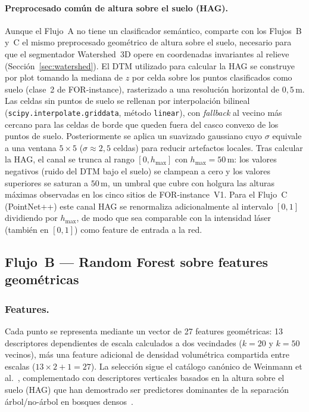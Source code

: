 \documentclass[runningheads]{llncs}
\begin{document}
\paragraph{Preprocesado com\'un de altura sobre el suelo (HAG).}
Aunque el Flujo~A no tiene un clasificador sem\'antico, comparte con los Flujos~B y~C el mismo preprocesado geom\'etrico de altura sobre el suelo, necesario para que el segmentador Watershed~3D opere en coordenadas invariantes al relieve (Secci\'on~\ref{sec:watershed}). El DTM utilizado para calcular la HAG se construye por plot tomando la mediana de $z$ por celda sobre los puntos clasificados como suelo (clase~2 de FOR-instance), rasterizado a una resoluci\'on horizontal de $0{,}5$\,m. Las celdas sin puntos de suelo se rellenan por interpolaci\'on bilineal (\texttt{scipy.interpolate.griddata}, m\'etodo \texttt{linear}), con \emph{fallback} al vecino m\'as cercano para las celdas de borde que queden fuera del casco convexo de los puntos de suelo. Posteriormente se aplica un suavizado gaussiano cuyo $\sigma$ equivale a una ventana $5 \times 5$ ($\sigma \approx 2{,}5$ celdas) para reducir artefactos locales. Tras calcular la HAG, el canal se trunca al rango $[0, h_{\max}]$ con $h_{\max} = 50$\,m: los valores negativos (ruido del DTM bajo el suelo) se clampean a cero y los valores superiores se saturan a $50$\,m, un umbral que cubre con holgura las alturas m\'aximas observadas en los cinco sitios de FOR-instance~V1. Para el Flujo~C (PointNet++) este canal HAG se renormaliza adicionalmente al intervalo $[0, 1]$ dividiendo por $h_{\max}$, de modo que sea comparable con la intensidad l\'aser (tambi\'en en $[0, 1]$) como feature de entrada a la red.

\subsection{Flujo~B --- Random Forest sobre features geom\'etricas}

\subsubsection{Features.}
Cada punto se representa mediante un vector de 27 features geom\'etricas: 13 descriptores dependientes de escala calculados a dos vecindades ($k\!=\!20$ y $k\!=\!50$ vecinos), m\'as una feature adicional de densidad volum\'etrica compartida entre escalas ($13 \times 2 + 1 = 27$). La selecci\'on sigue el cat\'alogo can\'onico de Weinmann et al.~\cite{weinmann2017}, complementado con descriptores verticales basados en la altura sobre el suelo (HAG) que han demostrado ser predictores dominantes de la separaci\'on \'arbol/no-\'arbol en bosques densos~\cite{li2023,bremer2023}.
\end{document}
